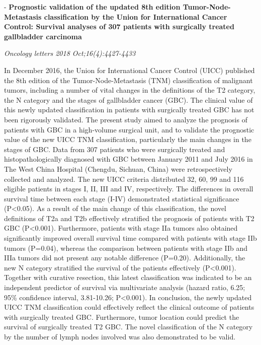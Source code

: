 \documentclass[]{article}
\begin{document}
 - \textbf{Prognostic validation of the updated 8th edition
Tumor-Node-Metastasis classification by the Union for International
Cancer Control: Survival analyses of 307 patients with surgically
treated gallbladder carcinoma}

\emph{Oncology letters 2018 Oct;16(4):4427-4433}

In December 2016, the Union for International Cancer Control (UICC)
published the 8th edition of the Tumor-Node-Metastasis (TNM)
classification of malignant tumors, including a number of vital changes
in the definitions of the T2 category, the N category and the stages of
gallbladder cancer (GBC). The clinical value of this newly updated
classification in patients with surgically treated GBC has not been
rigorously validated. The present study aimed to analyze the prognosis
of patients with GBC in a high-volume surgical unit, and to validate the
prognostic value of the new UICC TNM classification, particularly the
main changes in the stages of GBC. Data from 307 patients who were
surgically treated and histopathologically diagnosed with GBC between
January 2011 and July 2016 in The West China Hospital (Chengdu, Sichuan,
China) were retrospectively collected and analyzed. The new UICC
criteria distributed 32, 60, 99 and 116 eligible patients in stages I,
II, III and IV, respectively. The differences in overall survival time
between each stage (I-IV) demonstrated statistical significance
(P\textless{}0.05). As a result of the main change of this
classification, the novel definitions of T2a and T2b effectively
stratified the prognosis of patients with T2 GBC (P\textless{}0.001).
Furthermore, patients with stage IIa tumors also obtained significantly
improved overall survival time compared with patients with stage IIb
tumors (P=0.04), whereas the comparison between patients with stage IIb
and IIIa tumors did not present any notable difference (P=0.20).
Additionally, the new N category stratified the survival of the patients
effectively (P\textless{}0.001). Together with curative resection, this
latest classification was indicated to be an independent predictor of
survival via multivariate analysis (hazard ratio, 6.25; 95\% confidence
interval, 3.81-10.26; P\textless{}0.001). In conclusion, the newly
updated UICC TNM classification could effectively reflect the clinical
outcome of patients with surgically treated GBC. Furthermore, tumor
location could predict the survival of surgically treated T2 GBC. The
novel classification of the N category by the number of lymph nodes
involved was also demonstrated to be valid.
\end{document}

